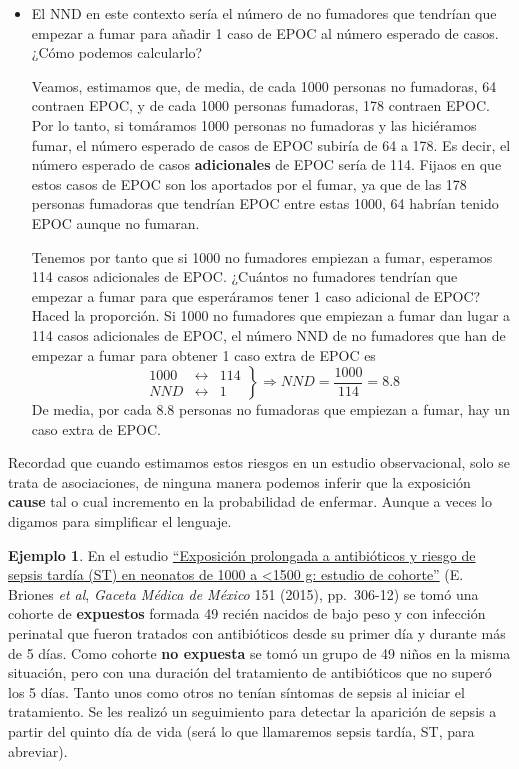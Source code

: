 \documentclass[
]{book}
\theoremstyle{definition}
\theoremstyle{definition}
\newtheorem{example}{Ejemplo}[chapter]
\theoremstyle{definition}
\theoremstyle{definition}
\theoremstyle{remark}
\begin{document}
\begin{itemize}
\item
  El NND en este contexto sería el número de no fumadores que tendrían que empezar a fumar para añadir 1 caso de EPOC al número esperado de casos.
  ¿Cómo podemos calcularlo?

  Veamos, estimamos que, de media, de cada 1000 personas no fumadoras, 64 contraen EPOC, y de cada 1000 personas fumadoras, 178 contraen EPOC. Por lo tanto, si tomáramos 1000 personas no fumadoras y las hiciéramos fumar, el número esperado de casos de EPOC subiría de 64 a 178. Es decir, el número esperado de casos \textbf{adicionales} de EPOC sería de 114. Fijaos en que estos casos de EPOC son los aportados por el fumar, ya que de las 178 personas fumadoras que tendrían EPOC entre estas 1000, 64 habrían tenido EPOC aunque no fumaran.

  Tenemos por tanto que si 1000 no fumadores empiezan a fumar, esperamos 114 casos adicionales de EPOC. ¿Cuántos no fumadores tendrían que empezar a fumar para que esperáramos tener 1 caso adicional de EPOC? Haced la proporción. Si 1000 no fumadores que empiezan a fumar dan lugar a 114 casos adicionales de EPOC, el número NND de no fumadores que han de empezar a fumar para obtener 1 caso extra de EPOC es
  \[
  \left.\begin{array}{ccc}
  1000 & \longleftrightarrow & 114\\ \mathit{NND} & \longleftrightarrow & 1
  \end{array}\right\}
  \Longrightarrow
  \mathit{NND}=\frac{1000}{114}=8.8
  \]
  De media, por cada 8.8 personas no fumadoras que empiezan a fumar, hay un caso extra de EPOC.
\end{itemize}

\begin{rmdcaution}
Recordad que cuando estimamos estos riesgos en un estudio observacional, solo se trata de asociaciones, de ninguna manera podemos inferir que la exposición \textbf{cause} tal o cual incremento en la probabilidad de enfermar. Aunque a veces lo digamos para simplificar el lenguaje.
\end{rmdcaution}

\begin{example}
\protect\hypertarget{exm:sepsis1}{}\label{exm:sepsis1}En el estudio \href{https://www.medigraphic.com/pdfs/gaceta/gm-2015/gm153d.pdf}{``Exposición prolongada a antibióticos y riesgo de sepsis tardía (ST) en neonatos de 1000 a \textless1500 g: estudio de cohorte''} (E. Briones \emph{et al}, \emph{Gaceta Médica de México} 151 (2015), pp.~306-12) se tomó una cohorte de \textbf{expuestos} formada 49 recién nacidos de bajo peso y con infección perinatal que fueron tratados con antibióticos desde su primer día y durante más de 5 días. Como cohorte \textbf{no expuesta} se tomó un grupo de 49 niños en la misma situación, pero con una duración del tratamiento de antibióticos que no superó los 5 días. Tanto unos como otros no tenían síntomas de sepsis al iniciar el tratamiento. Se les realizó un seguimiento para detectar la aparición de sepsis a partir del quinto día de vida (será lo que llamaremos sepsis tardía, ST, para abreviar).
\end{example}
\end{document}
